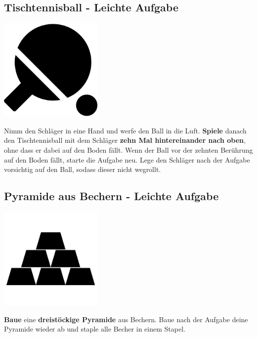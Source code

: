 \subsection{Tischtennisball - Leichte Aufgabe}
\vfill
\begin{center}
    \includegraphics[height=5cm]{graphics/table_tennis.png}
\end{center}
\vfill
Nimm den Schläger in eine Hand und werfe den Ball in die Luft.
\textbf{Spiele} danach den Tischtennisball
mit dem Schläger \textbf{zehn Mal hintereinander nach oben}, ohne dass er dabei
auf den Boden fällt.
Wenn der Ball vor der zehnten Berührung auf den Boden fällt, starte die Aufgabe
neu.
Lege den Schläger nach der Aufgabe vorsichtig auf den Ball, sodass dieser nicht
wegrollt.
\newline
\newpage

\subsection{Pyramide aus Bechern - Leichte Aufgabe}
\vfill
\begin{center}
    \includegraphics[height=5cm]{graphics/cup_pyramid.jpg}
\end{center}
\vfill
\textbf{Baue} eine \textbf{dreistöckige Pyramide} aus Bechern.
Baue nach der Aufgabe deine Pyramide wieder ab und staple alle Becher in einem
Stapel.
\newline
\newpage

